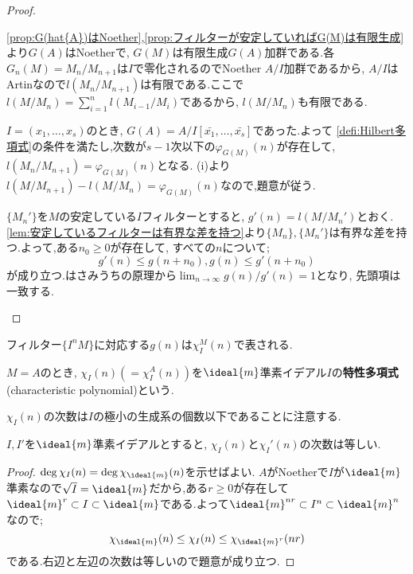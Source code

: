 \begin{proof}
	\begin{sakura}
		\item \ref{prop:G(hat{A})はNoether},\ref{prop:フィルターが安定していればG(M)は有限生成}より$G(A)$はNoetherで, $G(M)$は有限生成$G(A)$加群である.各$G_n(M)=M_n/M_{n+1}$は$I$で零化されるのでNoether $A/I$加群であるから, $A/I$はArtinなので$l(M_n/M_{n+1})$は有限である.ここで$l(M/M_n)=\sum_{i=1}^n l(M_{i-1}/M_i)$であるから, $l(M/M_n)$も有限である.
		\item $I=(x_1,\dots,x_s)$のとき, $G(A)=A/I[\bar{x_1},\dots,\bar{x_s}]$であった.よって \ref{defi:Hilbert多項式}の条件を満たし,次数が$s-1$次以下の$\varphi_{G(M)}(n)$が存在して, $l(M_n/M_{n+1})=\varphi_{G(M)}(n)$となる. (i)より$l(M/M_{n+1})-l(M/M_n)=\varphi_{G(M)}(n)$なので,題意が従う.
		\item $\{M_n'\}$を$M$の安定している$I$フィルターとすると, $g'(n)=l(M/M_n')$とおく. \ref{lem:安定しているフィルターは有界な差を持つ}より$\{M_n\},\{M_n'\}$は有界な差を持つ.よって,ある$n_0\geq0$が存在して, すべての$n$について;
		\[g'(n)\leq g(n+n_0), g(n)\leq g'(n+n_0)\]
		が成り立つ.はさみうちの原理から$\lim_{n\to\infty} g(n)/g'(n)=1$となり, 先頭項は一致する.
	\end{sakura}
\end{proof}

フィルター$\{I^n M\}$に対応する$g(n)$は$\chi_I^M(n)$で表される.

\begin{defi}[特性多項式]
	$M=A$のとき, $\chi_I(n)(=\chi_I^A(n))$を$\ideal{m}$準素イデアル$I$の\textbf{特性多項式}(characteristic polynomial)という.
\end{defi}

$\chi_I(n)$の次数は$I$の極小の生成系の個数以下であることに注意する.

\begin{prop}
	$I,I'$を$\ideal{m}$準素イデアルとすると, $\chi_I(n)$と$\chi_I'(n)$の次数は等しい.
\end{prop}

\begin{proof}
	$\deg\chi_I(n)=\deg\chi_{\ideal{m}}(n)$を示せばよい. $A$がNoetherで$I$が$\ideal{m}$準素なので$\sqrt{I}=\ideal{m}$だから,ある$r\geq0$が存在して$\ideal{m}^r\subset I\subset\ideal{m}$である.よって$\ideal{m}^{nr}\subset I^n\subset\ideal{m}^n$なので;
	\[\chi_{\ideal{m}}(n)\leq\chi_I(n)\leq\chi_{\ideal{m}^r}(nr)\]
	である.右辺と左辺の次数は等しいので題意が成り立つ.
\end{proof}

